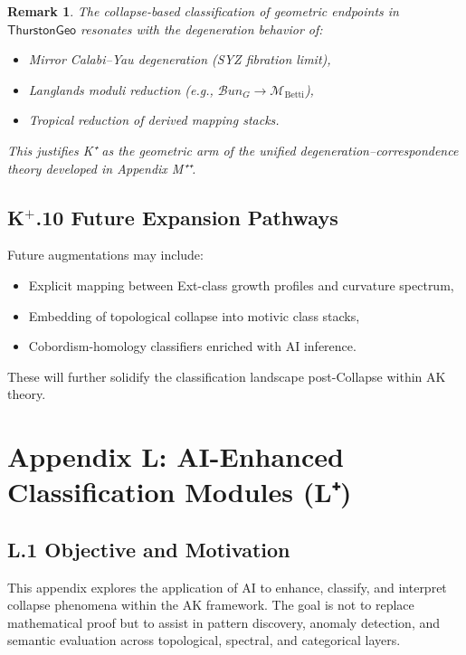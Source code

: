 \documentclass[11pt]{article}
\newtheorem{remark}[theorem]{Remark}
\begin{document}
\begin{axiom}
\begin{axiom}
\begin{remark}
The collapse-based classification of geometric endpoints in \( \mathsf{ThurstonGeo} \)
resonates with the degeneration behavior of:
\begin{itemize}
  \item Mirror Calabi–Yau degeneration (SYZ fibration limit),
  \item Langlands moduli reduction (e.g., \( \mathcal{B}un_G \to \mathcal{M}_{\text{Betti}} \)),
  \item Tropical reduction of derived mapping stacks.
\end{itemize}
This justifies K⁺ as the geometric arm of the unified degeneration–correspondence theory developed in Appendix M⁺⁺.
\end{remark}

\subsection*{K$^+$.10 Future Expansion Pathways}

Future augmentations may include:
\begin{itemize}
  \item Explicit mapping between Ext-class growth profiles and curvature spectrum,
  \item Embedding of topological collapse into motivic class stacks,
  \item Cobordism-homology classifiers enriched with AI inference.
\end{itemize}

These will further solidify the classification landscape post-Collapse within AK theory.





\section*{Appendix L: AI-Enhanced Classification Modules (L⁺)}

\subsection*{L.1 Objective and Motivation}

This appendix explores the application of AI to enhance, classify, and interpret collapse phenomena within the AK framework.  
The goal is not to replace mathematical proof but to assist in pattern discovery, anomaly detection, and semantic evaluation  
across topological, spectral, and categorical layers.


\end{axiom}
\end{axiom}
\end{document}
